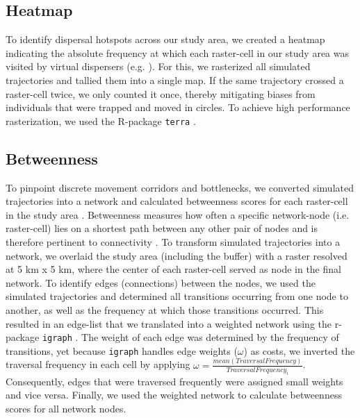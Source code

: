 \documentclass[abstract=on,10pt,a4paper,bibliography=totocnumbered]{article}
\begin{document}
\subsection{Heatmap}
To identify dispersal hotspots across our study area, we created a heatmap
indicating the absolute frequency at which each raster-cell in our study area
was visited by virtual dispersers (e.g. \citealp{Peer.2008, Hauenstein.2019,
Zeller.2020}). For this, we rasterized all simulated trajectories and tallied
them into a single map. If the same trajectory crossed a raster-cell twice, we
only counted it once, thereby mitigating biases from individuals that were
trapped and moved in circles. To achieve high performance rasterization, we used
the R-package {\tt terra} \citep{Hijmans.2021b}.

\subsection{Betweenness}
To pinpoint discrete movement corridors and bottlenecks, we converted simulated
trajectories into a network and calculated betweenness scores for each
raster-cell in the study area \citep{BastilleRousseau.2018}. Betweenness
measures how often a specific network-node (i.e. raster-cell) lies on a shortest
path between any other pair of nodes and is therefore pertinent to connectivity
\citep{BastilleRousseau.2018}. To transform simulated trajectories into a
network, we overlaid the study area (including the buffer) with a raster
resolved at 5 km x 5 km, where the center of each raster-cell served as node in
the final network. To identify edges (connections) between the nodes, we used
the simulated trajectories and determined all transitions occurring from one
node to another, as well as the frequency at which those transitions occurred.
This resulted in an edge-list that we translated into a weighted network using
the r-package {\tt igraph} \citep{Gabor.2006}. The weight of each edge was
determined by the frequency of transitions, yet because {\tt igraph} handles
edge weights (\(\omega\)) as costs, we inverted the traversal frequency in each
cell by applying \(\omega = \frac{mean(Traversal Frequency)}{Traversal
Frequency_i}\). Consequently, edges that were traversed frequently were assigned
small weights and vice versa. Finally, we used the weighted network to calculate
betweenness scores for all network nodes.
\end{document}
